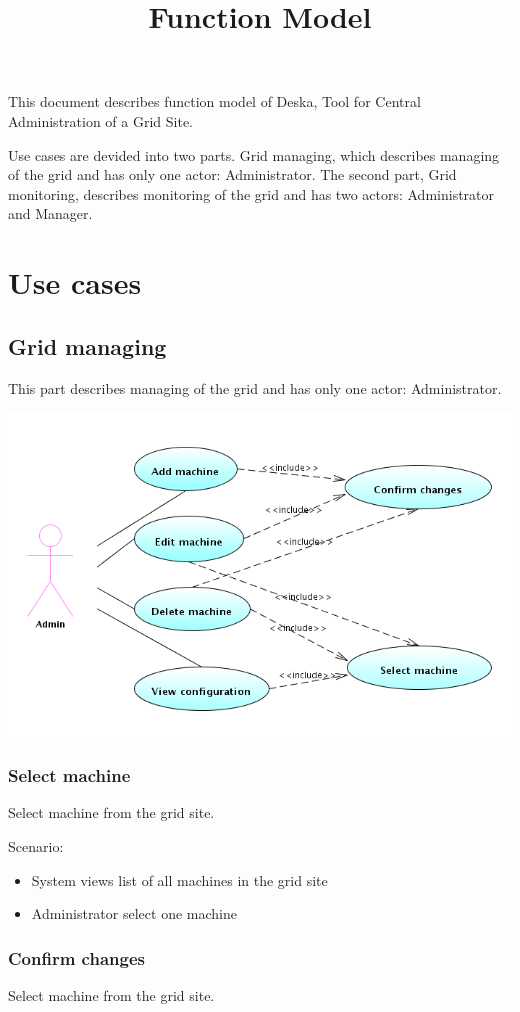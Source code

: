 \documentclass{article}
\begin{document}
\title{Function Model}

This document describes function model of Deska, Tool for Central Administration
of a Grid Site.

Use cases are devided into two parts. Grid managing, which
describes managing of the grid and has only one actor: Administrator.
The second part, Grid monitoring, describes monitoring of the grid and has
two actors: Administrator and Manager.

\section{Use cases}

\subsection{Grid managing}
This part describes managing of the grid and has only one actor: Administrator.

\includegraphics[width=\linewidth]{grid_managing.png}

\subsubsection{Select machine}
Select machine from the grid site.

Scenario:
\begin{itemize}
\item{System views list of all machines in the grid site}
\item{Administrator select one machine}
\end{itemize}

\subsubsection{Confirm changes}
Select machine from the grid site.
\end{document}
